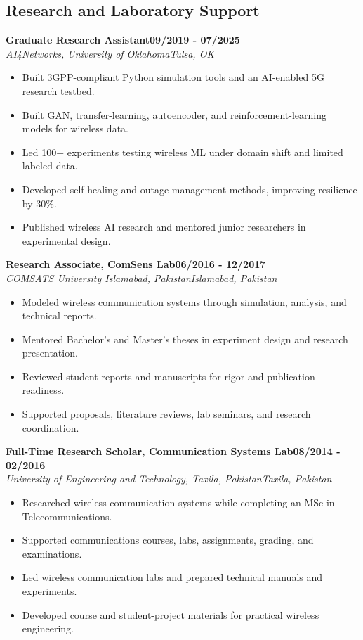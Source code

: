 \documentclass[9pt,letterpaper]{extarticle}
\newcommand{\role}[4]{%
  \Needspace{4\baselineskip}\textbf{#1}\hfill\textbf{#2}\\[-1pt]
  \textit{#3}\hfill\textit{#4}\par}
\begin{document}
\subsection{Research and Laboratory Support}
\role{Graduate Research Assistant}{09/2019 - 07/2025}{AI4Networks, University of Oklahoma}{Tulsa, OK}
\begin{itemize}
\item Built 3GPP-compliant Python simulation tools and an AI-enabled 5G research testbed.
\item Built GAN, transfer-learning, autoencoder, and reinforcement-learning models for wireless data.
\item Led 100+ experiments testing wireless ML under domain shift and limited labeled data.
\item Developed self-healing and outage-management methods, improving resilience by 30\%.
\item Published wireless AI research and mentored junior researchers in experimental design.
\end{itemize}
\vspace{1pt}
\role{Research Associate, ComSens Lab}{06/2016 - 12/2017}{COMSATS University Islamabad, Pakistan}{Islamabad, Pakistan}
\begin{itemize}
\item Modeled wireless communication systems through simulation, analysis, and technical reports.
\item Mentored Bachelor's and Master's theses in experiment design and research presentation.
\item Reviewed student reports and manuscripts for rigor and publication readiness.
\item Supported proposals, literature reviews, lab seminars, and research coordination.
\end{itemize}
\vspace{1pt}
\role{Full-Time Research Scholar, Communication Systems Lab}{08/2014 - 02/2016}{University of Engineering and Technology, Taxila, Pakistan}{Taxila, Pakistan}
\begin{itemize}
\item Researched wireless communication systems while completing an MSc in Telecommunications.
\item Supported communications courses, labs, assignments, grading, and examinations.
\item Led wireless communication labs and prepared technical manuals and experiments.
\item Developed course and student-project materials for practical wireless engineering.
\end{itemize}
\vspace{1pt}
\end{document}
